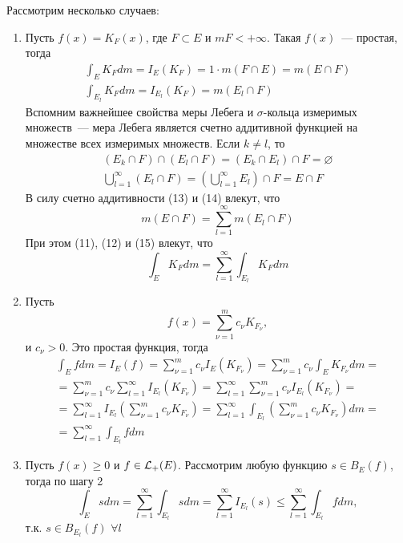 \documentclass[main]{subfiles}
\begin{document}
\begin{longProof}
    Рассмотрим несколько случаев:
    \begin{enumerate}
        \item Пусть $f(x) = K_F(x)$, где $F \subset E$ и $mF < +\infty$.
              Такая $f(x)$~--- простая, тогда
              \begin{gather*}
                  \int_E K_F dm = I_E(K_F) = 1 \cdot m(F \cap E) = m(E \cap F) \tag{11} \\
                  \int_{E_l} K_F dm = I_{E_l}(K_F) = m(E_l \cap F) \tag{12}
              \end{gather*}
              Вспомним важнейшее свойства меры Лебега и $\sigma$-кольца измеримых множеств~--- мера Лебега является счетно аддитивной функцией на множестве всех измеримых множеств.
              Если $k \neq l$, то
              \begin{gather*}
                  (E_k \cap F) \cap (E_l \cap F) = (E_k \cap E_l) \cap F = \varnothing \tag{13}\\
                  \bigcup_{l=1}^\infty (E_l \cap F) = \left(\bigcup_{l=1}^\infty E_l\right) \cap F = E \cap F \tag{14}
              \end{gather*}
              В силу счетно аддитивности (13) и (14) влекут, что
              \[m(E \cap F) = \sum_{l=1}^{\infty} m(E_l \cap F) \tag{15}\]
              При этом (11), (12) и (15) влекут, что
              \[\int_E K_F dm = \sum_{l=1}^{\infty} \int_{E_l} K_F dm \tag{16}\]
        \item Пусть
              \[f(x) = \sum_{\nu=1}^{m} c_\nu K_{F_\nu}, \tag{17}\]
              и $c_\nu > 0$.
              Это простая функция, тогда
              \begin{multline*}
                  \int_E f dm = I_E(f) = \sum_{\nu=1}^m c_\nu I_E(K_{F_\nu}) = \sum_{\nu=1}^{m} c_\nu \int_E K_{F_\nu} dm =\\
                  = \sum_{\nu=1}^{m} c_\nu \sum_{l=1}^{\infty} I_{E_l}(K_{F_\nu}) = \sum_{l=1}^{\infty} \sum_{\nu=1}^{m} c_\nu I_{E_l}(K_{F_\nu}) = \\
                  = \sum_{l=1}^{\infty} I_{E_l} \left(\sum_{\nu=1}^{m} c_\nu K_{F_\nu}\right) = \sum_{l=1}^{\infty} \int_{E_l} \left(\sum_{\nu=1}^{m} c_\nu K_{F_\nu}\right)dm =\\
                  = \sum_{l=1}^{\infty} \int_{E_l} f dm \tag{18}
              \end{multline*}
        \item Пусть $f(x) \ge 0$ и $f \in \mathcal{L}_+(E)$.
              Рассмотрим любую функцию $s \in B_E(f)$, тогда по шагу 2
              \[\int_E sdm = \sum_{l=1}^{\infty} \int_{E_l} sdm = \sum_{l=1}^{\infty} I_{E_l}(s) \le \sum_{l=1}^{\infty} \int_{E_l} fdm, \tag{19}\]
              т.к. $s \in B_{E_l}(f)$ $\forall l$


\end{enumerate}
\end{longProof}
\end{document}
